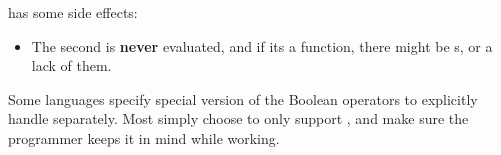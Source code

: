  has some side effects:
\begin{itemize}[noitemsep]
\item The second  is \textbf{never} evaluated, and if its a function, there might be s, or a lack of them.
\end{itemize}

Some languages specify special version of the Boolean operators to explicitly handle  separately.
Most simply choose to only support , and make sure the programmer keeps it in mind while working.


